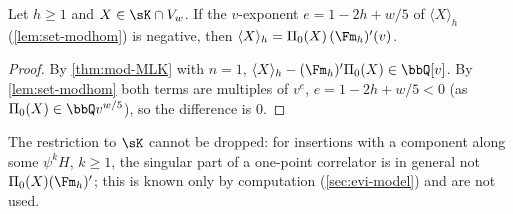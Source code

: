\begin{cor}
\label{cor:mod-onepoint}
Let $h\geq 1$ and $X\in\sK\cap V_w$. If the $v$-exponent $e=1-2h+w/5$ of $\langle X\rangle_h$ (\cref{lem:set-modhom}) is negative, then $\langle X\rangle_h=\Pi_0(X)\,(\Fm_h)'(v)$.
\end{cor}

\begin{proof}
By \cref{thm:mod-MLK} with $n=1$, $\langle X\rangle_h-(\Fm_h)'\Pi_0(X)\in\bbQ[v]$. By \cref{lem:set-modhom} both terms are multiples of $v^e$, $e=1-2h+w/5<0$ (as $\Pi_0(X)\in\bbQ v^{w/5}$), so the difference is $0$.
\end{proof}

\begin{rmk}[Off $\sK$]
\label{rmk:mod-offK}
The restriction to $\sK$ cannot be dropped: for insertions with a component along some $\psi^kH$, $k\geq 1$, the singular part of a one-point correlator is in general not $\Pi_0(X)(\Fm_h)'$; this is known only by computation (\cref{sec:evi-model}) and are not used.
\end{rmk}
